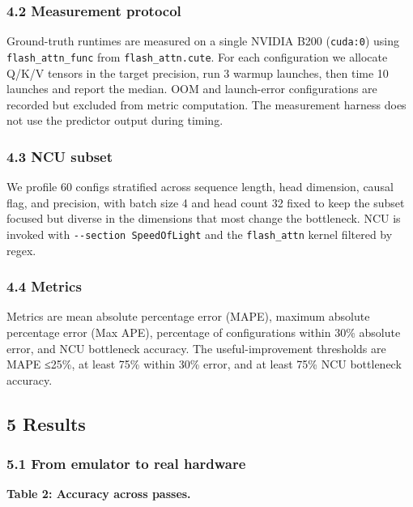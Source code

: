 \subsubsection{4.2 Measurement protocol}\label{measurement-protocol}

Ground-truth runtimes are measured on a single NVIDIA B200
(\texttt{cuda:0}) using \texttt{flash\_attn\_func} from
\texttt{flash\_attn.cute}. For each configuration we allocate Q/K/V
tensors in the target precision, run 3 warmup launches, then time 10
launches and report the median. OOM and launch-error configurations are
recorded but excluded from metric computation. The measurement harness
does not use the predictor output during timing.

\subsubsection{4.3 NCU subset}\label{ncu-subset}

We profile 60 configs stratified across sequence length, head dimension,
causal flag, and precision, with batch size 4 and head count 32 fixed to
keep the subset focused but diverse in the dimensions that most change
the bottleneck. NCU is invoked with \texttt{-\/-section\ SpeedOfLight}
and the \texttt{flash\_attn} kernel filtered by regex.

\subsubsection{4.4 Metrics}\label{metrics}

Metrics are mean absolute percentage error (MAPE), maximum absolute
percentage error (Max APE), percentage of configurations within 30\%
absolute error, and NCU bottleneck accuracy. The useful-improvement
thresholds are MAPE ≤25\%, at least 75\% within 30\% error, and at least
75\% NCU bottleneck accuracy.

\subsection{5 Results}\label{results}

\subsubsection{5.1 From emulator to real
hardware}\label{from-emulator-to-real-hardware}

\textbf{Table 2: Accuracy across passes.}


